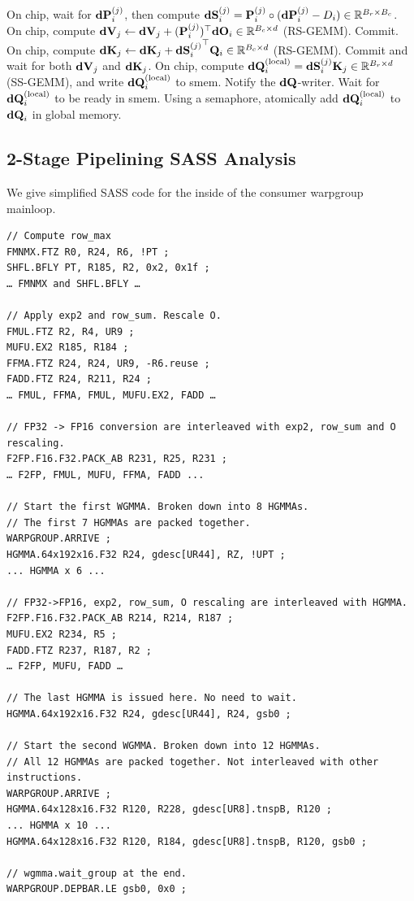 \begin{algorithm}[H]
\begin{algorithmic}[1]
\STATE On chip, wait for $\mathbf{dP}_i^{(j)}$, then compute $\mathbf{dS}_{i}^{(j)} = \mathbf{P}_{i}^{(j)} \circ (\mathbf{dP}_{i}^{(j)} - D_i) \in \mathbb{R}^{B_r \times B_c}$.
\STATE On chip, compute
$\mathbf{dV}_j \leftarrow \mathbf{dV}_j + (\mathbf{P}_{i}^{(j)})^\top \mathbf{dO}_i \in \mathbb{R}^{B_c \times d}$ (RS-GEMM). Commit.
\STATE On chip, compute $\mathbf{dK}_{j} \leftarrow \mathbf{dK}_j + {\mathbf{dS}_{i}^{(j)}}^\top \mathbf{Q}_i \in \mathbb{R}^{B_c \times
  d}$ (RS-GEMM). Commit and wait for both $\mathbf{dV}_j$ and $\mathbf{dK}_j$.
\STATE On chip, compute $\mathbf{dQ}_{i}^{(\mathrm{local})} = \mathbf{dS}_{i}^{(j)} \mathbf{K}_j \in
\mathbb{R}^{B_r \times d}$ (SS-GEMM), and write $\mathbf{dQ}_i^{(\mathrm{local})}$ to smem. Notify
the $\mathbf{dQ}$-writer.
\ENDFOR
{}
\STATE Wait for $\mathbf{dQ}_i^{(\mathrm{local})}$ to be ready in smem.
\STATE Using a semaphore, atomically add $\mathbf{dQ}_i^{(\mathrm{local})}$ to $\mathbf{dQ}_i$ in global memory.
\ENDFOR
\ENDIF
\end{algorithmic}
\end{algorithm}

\subsection{2-Stage Pipelining SASS Analysis}
\label{sec:2-stage-sass}

We give simplified SASS code for the inside of the consumer warpgroup mainloop.
\begin{small}
\begin{verbatim}
// Compute row_max
FMNMX.FTZ R0, R24, R6, !PT ;
SHFL.BFLY PT, R185, R2, 0x2, 0x1f ;
… FMNMX and SHFL.BFLY … 

// Apply exp2 and row_sum. Rescale O.
FMUL.FTZ R2, R4, UR9 ;
MUFU.EX2 R185, R184 ;                                            
FFMA.FTZ R24, R24, UR9, -R6.reuse ;
FADD.FTZ R24, R211, R24 ;                              
… FMUL, FFMA, FMUL, MUFU.EX2, FADD …

// FP32 -> FP16 conversion are interleaved with exp2, row_sum and O rescaling.
F2FP.F16.F32.PACK_AB R231, R25, R231 ;
… F2FP, FMUL, MUFU, FFMA, FADD ...

// Start the first WGMMA. Broken down into 8 HGMMAs.
// The first 7 HGMMAs are packed together.
WARPGROUP.ARRIVE ;
HGMMA.64x192x16.F32 R24, gdesc[UR44], RZ, !UPT ;
... HGMMA x 6 ...

// FP32->FP16, exp2, row_sum, O rescaling are interleaved with HGMMA. 
F2FP.F16.F32.PACK_AB R214, R214, R187 ; 
MUFU.EX2 R234, R5 ;
FADD.FTZ R237, R187, R2 ;
… F2FP, MUFU, FADD …

// The last HGMMA is issued here. No need to wait.
HGMMA.64x192x16.F32 R24, gdesc[UR44], R24, gsb0 ;

// Start the second WGMMA. Broken down into 12 HGMMAs.
// All 12 HGMMAs are packed together. Not interleaved with other instructions.
WARPGROUP.ARRIVE ;
HGMMA.64x128x16.F32 R120, R228, gdesc[UR8].tnspB, R120 ;
... HGMMA x 10 ...
HGMMA.64x128x16.F32 R120, R184, gdesc[UR8].tnspB, R120, gsb0 ;

// wgmma.wait_group at the end.
WARPGROUP.DEPBAR.LE gsb0, 0x0 ; 

\end{verbatim}
\end{small}

